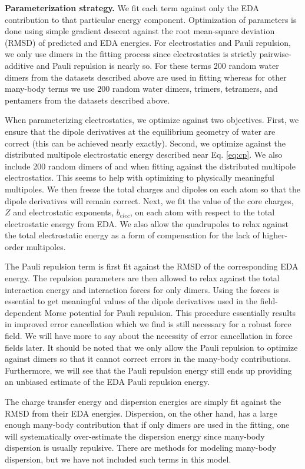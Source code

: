 \documentclass[journal=jctcce,manuscript=article]{achemso}
\begin{document}
\textbf{Parameterization strategy.} We fit each term against only the EDA contribution to that particular energy component. Optimization of parameters is done using simple gradient descent against the root mean-square deviation (RMSD) of predicted and EDA energies. For electrostatics and Pauli repulsion, we only use dimers in the fitting process since electrostatics is strictly pairwise-additive and Pauli repulsion is nearly so. For these terms 200 random water dimers from the datasets described above are used in fitting whereas for other many-body terms we use 200 random water dimers, trimers, tetramers, and pentamers from the datasets described above.

When parameterizing electrostatics, we optimize against two objectives. First, we ensure that the dipole derivatives at the equilibrium geometry of water are correct (this can be achieved nearly exactly). Second, we optimize against the distributed multipole electrostatic energy described near Eq. \ref{eq:cp}. We also include 200 random dimers of  and  when fitting against the distributed multipole electrostatics. This seems to help with optimizing to physically meaningful multipoles. We then freeze the total charges and dipoles on each atom so that the dipole derivatives will remain correct. Next, we fit the value of the core charges, $Z$ and electrostatic exponents, $b_{elec}$, on each atom with respect to the total electrostatic energy from EDA. We also allow the quadrupoles to relax against the total electrostatic energy as a form of compensation for the lack of higher-order multipoles.

The Pauli repulsion term is first fit against the RMSD of the corresponding EDA energy. The repulsion parameters are then allowed to relax against the total interaction energy and interaction forces for only dimers. Using the forces is essential to get meaningful values of the dipole derivatives used in the field-dependent Morse potential for Pauli repulsion. This procedure essentially results in improved error cancellation which we find is still necessary for a robust force field. We will have more to say about the necessity of error cancellation in force fields later. It should be noted that we only allow the Pauli repulsion to optimize against dimers so that it cannot correct errors in the many-body contributions. Furthermore, we will see that the Pauli repulsion energy still ends up providing an unbiased estimate of the EDA Pauli repulsion energy.

The charge transfer energy and dispersion energies are simply fit against the RMSD from their EDA energies. Dispersion, on the other hand, has a large enough many-body contribution that if only dimers are used in the fitting, one will systematically over-estimate the dispersion energy since many-body dispersion is usually repulsive. There are methods for modeling many-body dispersion, but we have not included such terms in this model.\cite{anatole2010two,van2018new} 
\end{document}
